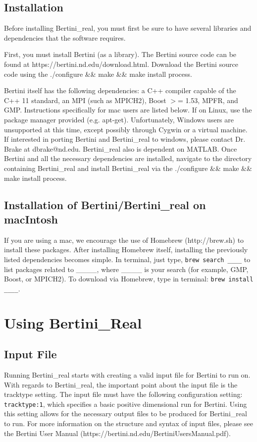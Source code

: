 \documentclass[10pt]{article}
\begin{document}
\subsection{Installation}
Before installing Bertini\_real, you must first be sure to have several libraries and dependencies that the software requires. \par
First, you must install Bertini (as a library).  The Bertini source code can be found \newline at https://bertini.nd.edu/download.html. Download the Bertini source code using the ./configure \&\& make \&\& make install process. \par
Bertini itself has the following dependencies: a C++ compiler capable of the C++ 11 standard, an MPI (such as MPICH2), Boost $>$= 1.53, MPFR, and GMP. Instructions specifically for mac users are listed below. If on Linux, use the package manager provided (e.g. apt-get). Unfortunately, Windows users are unsupported at this time, except possibly through Cygwin or a virtual machine. If interested in porting Bertini and Bertini\_real to windows, please contact Dr. Brake at dbrake@nd.edu. Bertini\_real also is dependent on MATLAB. Once Bertini and all the necessary dependencies are installed, navigate to the directory containing Bertini\_real and install Bertini\_real via the ./configure \&\& make \&\& make install process. \par
\subsection{Installation of Bertini/Bertini\_real on macIntosh}

\indent If you are using a mac, we encourage the use of Homebrew (http://brew.sh) to install these packages. After installing Homebrew itself, installing the previously listed dependencies becomes simple. In terminal, just type, \texttt{brew search \_\_\_\_} to list packages related to \_\_\_\_, where \_\_\_\_ is your search (for example, GMP, Boost, or MPICH2). To download via Homebrew, type in terminal: \texttt{brew install \_\_\_\_}.


\clearpage
\section{Using Bertini\_Real}
\label{sec:running}
\subsection{Input File}
Running Bertini\_real starts with creating a valid input file for Bertini to run on.  With regards to Bertini\_real, the important point about the input file is the tracktype setting. The input file must have the following configuration setting: \texttt{tracktype:1}, which specifies a basic positive dimensional run for Bertini. Using this setting allows for the necessary output files to be produced for Bertini\_real to run. For more information on the structure and syntax of input files, please see the Bertini User Manual  (https://bertini.nd.edu/BertiniUsersManual.pdf).
\end{document}
